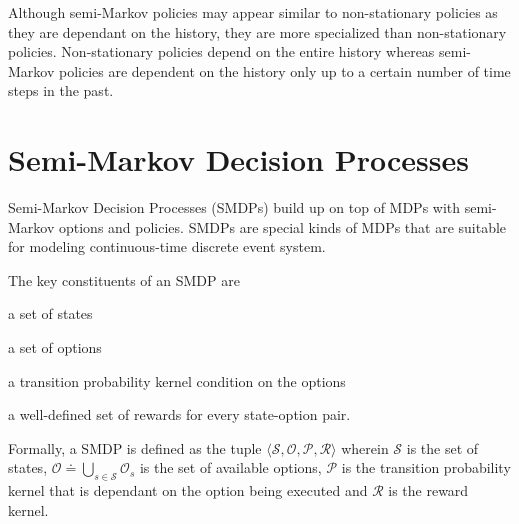 Although semi-Markov policies may appear similar to non-stationary policies as they are dependant on the history, they are more specialized than non-stationary policies.
Non-stationary policies depend on the entire history whereas semi-Markov policies are dependent on the history only up to a certain number of time steps in the past.


\section{Semi-Markov Decision Processes}


Semi-Markov Decision Processes (SMDPs) build up on top of MDPs with semi-Markov options and policies.
SMDPs are special kinds of MDPs that are suitable for modeling continuous-time discrete event system.

The key constituents of an SMDP are
\begin{inparaenum}[(a)]
    \item a set of states
    \item a set of options
    \item a transition probability kernel condition on the options
    \item a well-defined set of rewards for every state-option pair.
\end{inparaenum}

Formally, a SMDP is defined as the tuple $\langle \mathcal{S}, \mathcal{O}, \mathcal{P}, \mathcal{R} \rangle$ wherein $\mathcal{S}$ is the set of states, $\mathcal{O} \doteq \bigcup_{s \in \mathcal{S}} \mathcal{O}_s$ is the set of available options, $\mathcal{P}$ is the transition probability kernel that is dependant on the option being executed and $\mathcal{R}$ is the reward kernel.